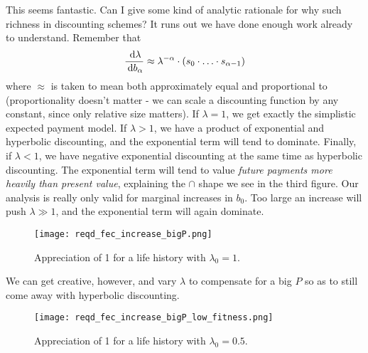 This seems fantastic. Can I give some kind of analytic rationale for why such richness in discounting schemes? It runs out we have
done enough work already to understand. Remember that 
$$ \frac{\:\textrm{d}\lambda}{\:\textrm{d}b_{\alpha}} \approx \lambda^{-\alpha}\cdot \left( s_0\cdot\ldots\cdot s_{\alpha - 1} \right)$$
where $\approx$ is taken to mean both approximately equal and proportional to (proportionality doesn't matter - we can scale a discounting
function by any constant, since only relative size matters). If $\lambda = 1$, we get exactly the simplistic expected payment model.
If $\lambda > 1$, we have a product of exponential and hyperbolic discounting, and the exponential term will tend to dominate. Finally,
if $\lambda < 1$, we have negative exponential discounting at the same time as hyperbolic discounting. The exponential term will tend to
value \textit{future payments more heavily than present value}, explaining the $\cap$ shape we see in the third figure. 
Our analysis is really only valid for marginal increases in $b_0$. Too large an increase will push $\lambda \gg 1$, and the exponential
term will again dominate.
\begin{figure}[H]
    \centering
    \texttt{[image: reqd\_fec\_increase\_bigP.png]}
    \caption{Appreciation of 1 for a life history with $\lambda_0 = 1$.}
\end{figure}
We can get creative, however, and vary $\lambda$ to compensate for a big $P$ so as to still come away with hyperbolic discounting. 
 \begin{figure}[H]
    \centering
    \texttt{[image: reqd\_fec\_increase\_bigP\_low\_fitness.png]}
    \caption{Appreciation of 1 for a life history with $\lambda_0 = 0.5$.}
\end{figure}  

